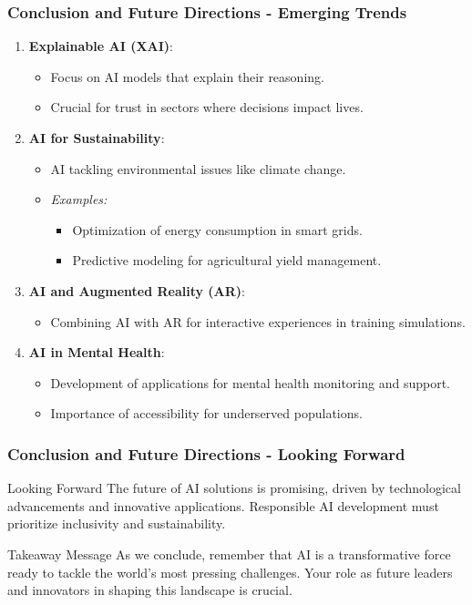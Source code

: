 \documentclass{beamer}
\begin{document}
\begin{frame}[fragile]
    \frametitle{Conclusion and Future Directions - Emerging Trends}
    \begin{enumerate}
        \item \textbf{Explainable AI (XAI)}:
        \begin{itemize}
            \item Focus on AI models that explain their reasoning.
            \item Crucial for trust in sectors where decisions impact lives.
        \end{itemize}
        
        \item \textbf{AI for Sustainability}:
        \begin{itemize}
            \item AI tackling environmental issues like climate change.
            \item \textit{Examples:}
            \begin{itemize}
                \item Optimization of energy consumption in smart grids.
                \item Predictive modeling for agricultural yield management.
            \end{itemize}
        \end{itemize}
        
        \item \textbf{AI and Augmented Reality (AR)}:
        \begin{itemize}
            \item Combining AI with AR for interactive experiences in training simulations.
        \end{itemize}
        
        \item \textbf{AI in Mental Health}:
        \begin{itemize}
            \item Development of applications for mental health monitoring and support.
            \item Importance of accessibility for underserved populations.
        \end{itemize}
    \end{enumerate}
\end{frame}

\begin{frame}[fragile]
    \frametitle{Conclusion and Future Directions - Looking Forward}
    \begin{block}{Looking Forward}
        The future of AI solutions is promising, driven by technological advancements and innovative applications. Responsible AI development must prioritize inclusivity and sustainability.
    \end{block}
    
    \begin{block}{Takeaway Message}
        As we conclude, remember that AI is a transformative force ready to tackle the world’s most pressing challenges. Your role as future leaders and innovators in shaping this landscape is crucial.
    \end{block}
\end{frame}
\end{document}
